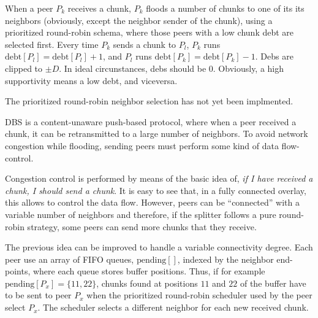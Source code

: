 
\label{sec:chunk_flooding}

\begin{comment}
\begin{figure*}
  \fig{300}{3cm}{peer_chunk_flooding}
  \caption{Chunk flooding at peers.\label{fig:peer_chunk_flooding}}
\end{figure*}
\end{comment}

When a peer $P_k$ receives a chunk, $P_k$ floods a number of chunks to
one of its its neighbors (obviously, except the neighbor sender of the
chunk), using a prioritized round-robin schema, where those peers with
a low chunk debt are selected first. Every time $P_k$ sends a chunk to
$P_l$, $P_k$ runs $\text{debt}[P_l] = \text{debt}[P_l]+1$, and $P_l$
runs $\text{debt}[P_k] = \text{debt}[P_k]-1$.  Debs are clipped to
$\pm D$. In ideal circunstances, debs should be $0$. Obviously, a high
supportivity means a low debt, and viceversa.

\begin{notex}
  The prioritized round-robin neighbor selection has not yet been
  implmented.
\end{notex}

DBS is a content-unaware push-based protocol, where when a peer
received a chunk, it can be retransmitted to a large number of
neighbors. To avoid network congestion while flooding, sending peers
must perform some kind of data flow-control.


Congestion control is performed by means of the basic idea of, {\sl if
  I have received a chunk, I should send a chunk}. It is easy to see
that, in a fully connected overlay, this allows to control the data
flow. However, peers can be ``connected'' with a variable number of
neighbors and therefore, if the splitter follows a pure round-robin
strategy, some peers can send more chunks that they receive.

The previous idea can be improved to handle a variable connectivity
degree. Each peer use an array of FIFO queues, $\text{pending}[]$,
indexed by the neighbor end-points, where each queue stores buffer
positions. Thus, if for example $\text{pending}[P_x]=\{11,22\}$,
chunks found at positions $11$ and $22$ of the buffer have to be sent
to peer $P_x$ when the prioritized round-robin scheduler used by the
peer select $P_x$. The scheduler selects a different neighbor for each
new received chunk.

